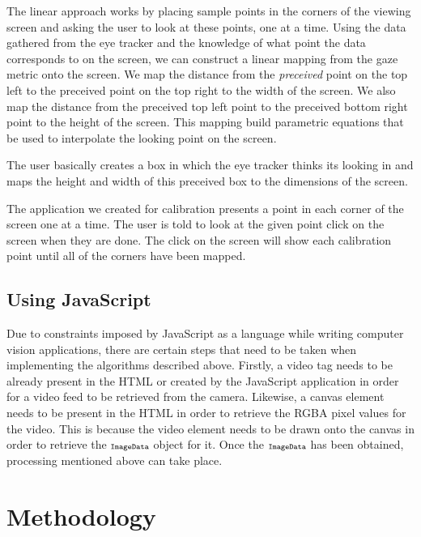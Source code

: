 \documentclass[annual]{acmsiggraph}
\newcommand{\Acronym}[1]{\ensuremath{{\small{\texttt{#1}}}}}
\begin{document}
The linear approach works by placing sample points in the corners of the
viewing screen and asking the user to look at these points, one at a time.
Using the data gathered from the eye tracker and the knowledge of what point
the data corresponds to on the screen, we can construct a linear mapping from
the gaze metric onto the screen. We map the distance from the \emph{preceived}
point on the top left to the preceived point on the top right to the width of
the screen. We also map the distance from the preceived top left point to the
preceived bottom right point to the height of the screen. This mapping build
parametric equations that be used to interpolate the looking point on the
screen.

The user basically creates a box in which the eye tracker thinks its looking in
and maps the height and width of this preceived box to the dimensions of the
screen.

The application we created for calibration presents a point in each corner of
the screen one at a time. The user is told to look at the given point click on
the screen when they are done. The click on the screen will show each
calibration point until all of the corners have been mapped. 

\subsection{Using JavaScript}

%
%
%

Due to constraints imposed by JavaScript as a language while writing computer
vision applications, there are certain steps that need to be taken when
implementing the algorithms described above. Firstly, a video tag needs to be
already present in the HTML or created by the JavaScript application in order
for a video feed to be retrieved from the camera. Likewise, a canvas element
needs to be present in the HTML in order to retrieve the RGBA pixel values for
the video.  This is because the video element needs to be drawn onto the canvas
in order to retrieve the $\Acronym{ImageData}$ object for it. Once the
$\Acronym{ImageData}$ has been obtained, processing mentioned above can take
place.

\section{Methodology}
\end{document}
